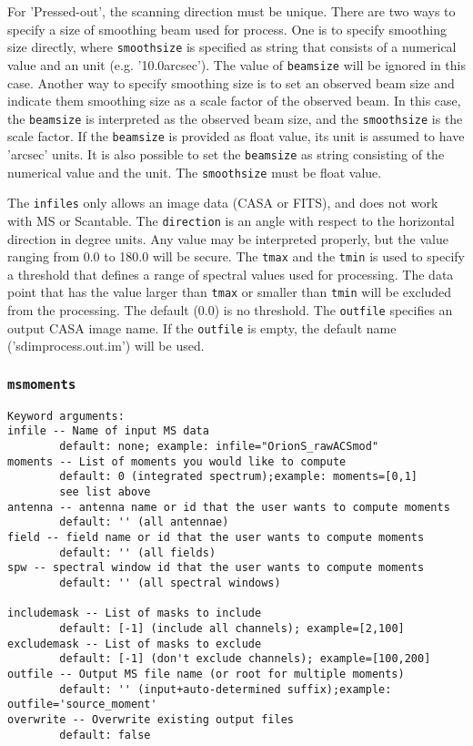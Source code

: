 For 'Pressed-out', the scanning direction must be unique. There are 
two ways to specify a size of smoothing beam used for process. One 
is to specify smoothing size directly, where {\tt smoothsize} is specified
as string that consists of a numerical value and an unit 
(e.g. '10.0arcsec'). The value of {\tt beamsize} will be ignored in this case. 
Another way to specify smoothing size is to set an observed beam size 
and indicate them smoothing size as a scale factor of the observed beam.
In this case, the {\tt beamsize} is interpreted as the observed beam 
size, and the {\tt smoothsize} is the scale factor. If the {\tt beamsize} is 
provided as float value, its unit is assumed to have 'arcsec' units. It is also 
possible to set the {\tt beamsize} as string consisting of the numerical 
value and the unit. The {\tt smoothsize} must be float value.

The {\tt infiles} only allows an image data (CASA or FITS), and does
not work with MS or Scantable. The {\tt direction} is an angle with respect 
to the horizontal direction in degree units. Any value may be 
interpreted properly, but the value ranging from 0.0 to 180.0 will be 
secure. The {\tt tmax} and the {\tt tmin} is used to specify a threshold that 
defines a range of spectral values used for processing. The data point 
that has the value larger than {\tt tmax} or smaller than {\tt tmin} will be 
excluded from the processing. The default (0.0) is no threshold. 
The {\tt outfile} specifies an output CASA image name. If the {\tt outfile} 
is empty, the default name ('sdimprocess.out.im') will be used. 


\subsubsection{{\tt msmoments}}
\label{section:sd.sdtasks.tasks.sdmoments}

\begin{verbatim}
Keyword arguments:
infile -- Name of input MS data
        default: none; example: infile="OrionS_rawACSmod"
moments -- List of moments you would like to compute
        default: 0 (integrated spectrum);example: moments=[0,1]
        see list above
antenna -- antenna name or id that the user wants to compute moments
        default: '' (all antennae)
field -- field name or id that the user wants to compute moments
        default: '' (all fields)
spw -- spectral window id that the user wants to compute moments
        default: '' (all spectral windows)

includemask -- List of masks to include
        default: [-1] (include all channels); example=[2,100]
excludemask -- List of masks to exclude
        default: [-1] (don't exclude channels); example=[100,200]
outfile -- Output MS file name (or root for multiple moments)
        default: '' (input+auto-determined suffix);example: outfile='source_moment'
overwrite -- Overwrite existing output files
        default: false
\end{verbatim}

